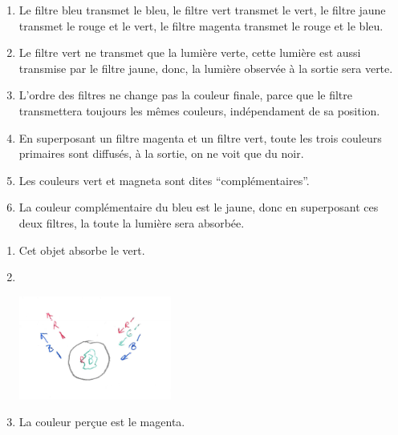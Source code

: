 \documentclass[12pt, a4paper]{article}
\begin{document}
    \begin{Exercise}[number={22}]
        \begin{enumerate}[1.]
            \item	Le filtre bleu transmet le bleu, le filtre vert transmet le vert, le filtre jaune transmet le rouge et le vert, le filtre magenta transmet le rouge et le bleu.
            \item   Le filtre vert ne transmet que la lumière verte, cette lumière est aussi transmise par le filtre jaune, donc, la lumière observée à la sortie sera verte. 
            \item   L'ordre des filtres ne change pas la couleur finale, parce que le filtre transmettera toujours les mêmes couleurs, indépendament de sa position.
            \item   En superposant un filtre magenta et un filtre vert, toute les trois couleurs primaires sont diffusés, à la sortie, on ne voit que du noir.
            \item   Les couleurs vert et magneta sont dites ``complémentaires''.
            \item   La couleur complémentaire du bleu est le jaune, donc en superposant ces deux filtres, la toute la lumière sera absorbée.
        \end{enumerate}
    \end{Exercise}

    \begin{Exercise}[number={23}]
        \begin{enumerate}[1.]
            \item	Cet objet absorbe le vert.
            \item \ \\ \parbox{\linewidth}{
                        \centering\vspace{-\baselineskip}
                        \includegraphics[width=5cm]{EX23img1.jpg}
                    }
            \item   La couleur perçue est le magenta.
        \end{enumerate}
    \end{Exercise}
\end{document}
